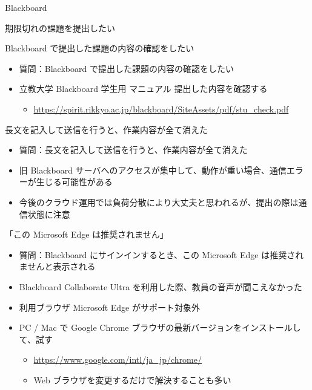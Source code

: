 \documentclass[a4j,10pt]{jsarticle}
\begin{document}
{\begin{frame}[label={sec:orgc119bb0},fragile]{Blackboard}
\begin{block}{期限切れの課題を提出したい}
\begin{itemize}
\end{itemize}
\end{block}
\par
\begin{block}{Blackboard で提出した課題の内容の確認をしたい}
\begin{itemize}
\item 質問：Blackboard で提出した課題の内容の確認をしたい
\par
\item 立教大学 Blackboard 学生用 マニュアル 提出した内容を確認する
\begin{itemize}
\item \url{https://spirit.rikkyo.ac.jp/blackboard/SiteAssets/pdf/stu\_check.pdf}
\end{itemize}
\end{itemize}
\end{block}
\par
\begin{block}{長文を記入して送信を行うと、作業内容が全て消えた}
\begin{itemize}
\item 質問：長文を記入して送信を行うと、作業内容が全て消えた
\par
\item 旧 Blackboard サーバへのアクセスが集中して、動作が重い場合、通信エラーが生じる可能性がある
\item 今後のクラウド運用では負荷分散により大丈夫と思われるが、提出の際は通信状態に注意
\end{itemize}
\end{block}
\par
\begin{block}{「この Microsoft Edge は推奨されません」}
\begin{itemize}
\item 質問：Blackboard にサインインするとき、この Microsoft Edge は推奨されませんと表示される
\item Blackboard Collaborate Ultra を利用した際、教員の音声が聞こえなかった
\par
\item 利用ブラウザ Microsoft Edge がサポート対象外
\par
\item PC / Mac で Google Chrome ブラウザの最新バージョンをインストールして、試す
\begin{itemize}
\item \url{https://www.google.com/intl/ja\_jp/chrome/}
\item Web ブラウザを変更するだけで解決することも多い

\end{itemize}
\end{itemize}
\end{block}
\end{frame}}
\end{document}
